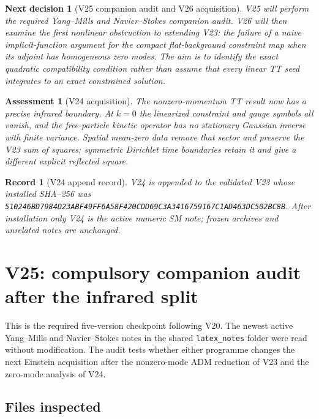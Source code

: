 \documentclass[11pt]{article}
\newtheorem{decision}[theorem]{Next decision}
\newtheorem{assessment}[theorem]{Assessment}
\newtheorem{record}[theorem]{Record}
\theoremstyle{remark}
\begin{document}
\begin{decision}[V25 companion audit and V26 acquisition]
\label{dec:v19v24-next}
V25 will perform the required Yang--Mills and Navier--Stokes companion
audit.  V26 will then examine the first nonlinear obstruction to extending
V23: the failure of a naive implicit-function argument for the compact
flat-background constraint map when its adjoint has homogeneous zero
modes.  The aim is to identify the exact quadratic compatibility
condition rather than assume that every linear TT seed integrates to an
exact constrained solution.
\end{decision}

\begin{assessment}[V24 acquisition]
\label{ass:v19v24}
The nonzero-momentum TT result now has a precise infrared boundary.  At
\(k=0\) the linearized constraint and gauge symbols all vanish, and the
free-particle kinetic operator has no stationary Gaussian inverse with
finite variance.  Spatial mean-zero data remove that sector and preserve
the V23 sum of squares; symmetric Dirichlet time boundaries retain it and
give a different explicit reflected square.
\end{assessment}

\begin{record}[V24 append record]
\label{rec:v19v24}
V24 is appended to the validated V23 whose installed SHA--256 was
\texttt{510246BD7984D23ABF49FF6A58F420CDD69C3A3416759167C1AD463DC502BC8B}.
After installation only V24 is the active numeric SM note; frozen archives
and unrelated notes are unchanged.
\end{record}



\section{V25: compulsory companion audit after the infrared split}
\label{sec:v19v25}

This is the required five-version checkpoint following V20.  The newest
active Yang--Mills and Navier--Stokes notes in the shared
\texttt{latex\_notes} folder were read without modification.  The audit
tests whether either programme changes the next Einstein acquisition
after the nonzero-mode ADM reduction of V23 and the zero-mode analysis of
V24.

\subsection{Files inspected}
\end{document}
